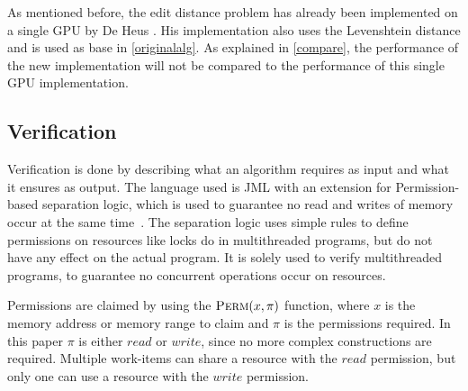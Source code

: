 As mentioned before, the edit distance problem has already been implemented on a single GPU by De Heus \cite{Heus}.
His implementation also uses the Levenshtein distance and is used as base in \cref{originalalg}.
As explained in \cref{compare}, the performance of the new implementation will not be compared to the performance of this single GPU implementation.

\subsection{Verification}
Verification is done by describing what an algorithm requires as input and what it ensures as output.
The language used is JML with an extension for Permission-based separation logic, which is used to guarantee no read and writes of memory occur at the same time~\cite{vercors}.
The separation logic uses simple rules to define permissions on resources like locks do in multithreaded programs, but do not have any effect on the actual program.
It is solely used to verify multithreaded programs, to guarantee no concurrent operations occur on resources. 

Permissions are claimed by using the $\textproc{Perm}(x, \pi)$ function, where $x$ is the memory address or memory range to claim and $\pi$ is the permissions required.
In this paper $\pi$ is either $read$ or $write$, since no more complex constructions are required.
Multiple work-items can share a resource with the $read$ permission, but only one can use a resource with the $write$ permission.
